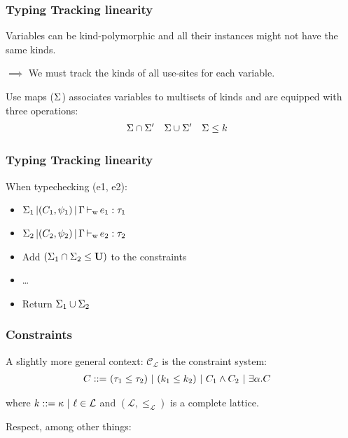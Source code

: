\documentclass[xcolor=svgnames,11pt]{beamer}
\begin{document}
\begin{frame}
  \frametitle{Typing \hfill Tracking linearity}

  Variables can be kind-polymorphic and all their instances might not have the same kinds.

  $\implies$ We must track the kinds of all use-sites for each variable.\pause

  Use maps ($\Sigma$) associates variables to multisets of kinds
  and are equipped with three operations:
  \begin{align*}
    \Sigma&\cap\Sigma'& \Sigma&\cup\Sigma' & \Sigma &\leq k
  \end{align*}
\end{frame}

\begin{frame}
  \frametitle{Typing \hfill Tracking linearity}
  
  When typechecking (e1, e2):
  \begin{itemize}[<+->]
  \item $\Sigma_1 \operatorname{|} (C_1,\psi_1) \operatorname{|} \Gamma \operatorname{\vdash_w} e_1 : \tau_1$
  \item $\Sigma_2 \operatorname{|} (C_2,\psi_2) \operatorname{|} \Gamma \operatorname{\vdash_w} e_2 : \tau_2$
  \item Add  $(\Sigma_1\cap\Sigma_2\leq \mathbf{U})$ to the constraints
  \item \dots
  \item Return $\Sigma_1\cup\Sigma_2$
  \end{itemize}

\end{frame}


\newcommand\lub\bigvee
\newcommand\glb\bigwedge
\newcommand\CL{{\mathcal C_{\mathcal L}}}

\begin{frame}
  \frametitle{Constraints}

  A slightly more general context: $\CL$ is the constraint system:
  \begin{align*}
    C ::=&\ (\tau_1 \leq \tau_2)\ |\ (k_1 \leq k_2)\ |\ C_1 \wedge C_2\ |\ \exists \alpha.C
  \end{align*}

  where $k ::=\kappa\ |\ \ell \in {\mathcal L}$ and
  $(\mathcal L, \leq_{\mathcal L})$ is a complete lattice.
  \pause

  Respect, among other things:
  
\end{frame}
\end{document}

